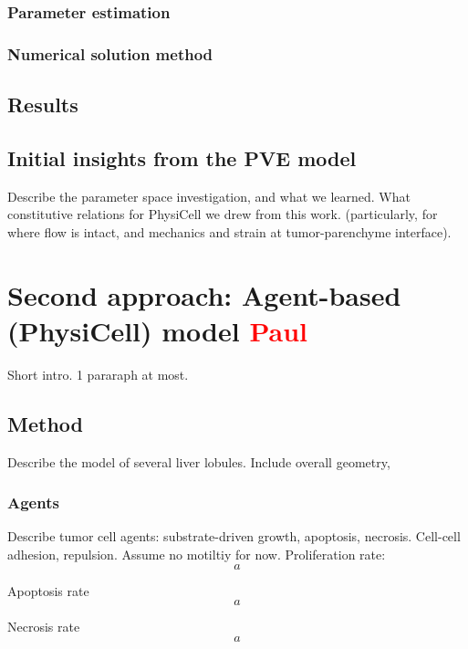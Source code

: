 \documentclass[smallextended,natbib]{svjour3}
\newcommand{\beq}{\begin{equation}}
\newcommand{\eeq}{\end{equation}}
\newcommand{\red}[1]{\textcolor{red}{#1}}
\begin{document}
\subsubsection{Parameter estimation}
\subsubsection{Numerical solution method}

\subsection{Results}

\subsection{Initial insights from the PVE model}

Describe the parameter space investigation, and what we learned. What constitutive  
relations for PhysiCell we drew from this work. (particularly, for where flow is intact, 
and mechanics and strain at tumor-parenchyme interface). 

\vfill
\pagebreak 

\section{Second approach: Agent-based (PhysiCell) model \red{Paul}}
\label{section:ABM}
Short intro. 1 pararaph at most. 

\subsection{Method}
Describe the model of several liver lobules.  Include overall geometry, 


\subsubsection{Agents}
Describe tumor cell agents: substrate-driven growth, apoptosis, necrosis. Cell-cell adhesion, repulsion. Assume no 
motiltiy for now. Proliferation rate: 
\beq
a
\eeq

Apoptosis rate
\beq
a
\eeq

Necrosis rate
\beq
a
\eeq
\end{document}
